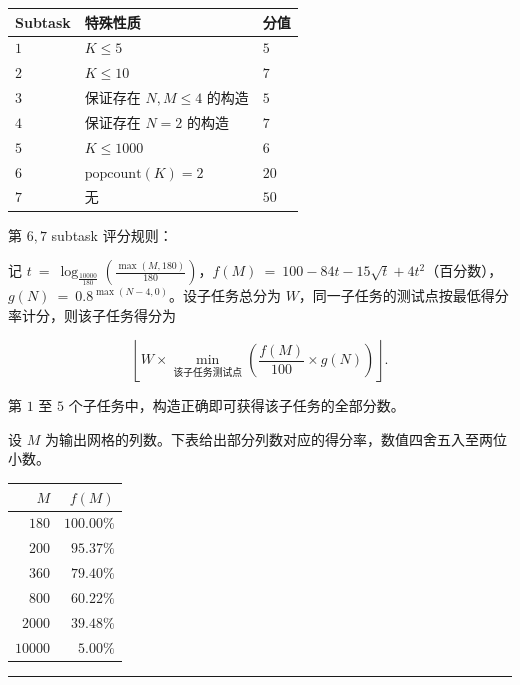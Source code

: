 \documentclass[12pt,a4paper,oneside]{ctexart}
\begin{document}
{\def\LTcaptype{none} %
\begin{longtable}[]{l|l|l}
\toprule\noalign{}
Subtask & 特殊性质 & 分值 \\
\midrule\noalign{}
\endhead
\bottomrule\noalign{}
\endlastfoot
\(1\) & \(K\le5\) & \(5\) \\ \hline
\(2\) & \(K\le10\) & \(7\) \\ \hline
\(3\) & 保证存在 \(N,M\le4\) 的构造 & \(5\) \\ \hline
\(4\) & 保证存在 \(N=2\) 的构造 & \(7\) \\ \hline
\(5\) & \(K\le1000\) & \(6\) \\ \hline
\(6\) & \(\text{popcount}(K)=2\) & \(20\) \\ \hline
\(7\) & 无 & \(50\) \\
\end{longtable}
}

第 \(6,7\) subtask 评分规则：

记 \(t\ =\ \log_{\frac{10000}{180}}\left(\frac{\max\left(M,180\right)}{180}\right)\)，\(f(M)\ =\ 100-84t-15\sqrt{t}+4t^{2}\)（百分数），\(g(N)\ =\ 0.8^{\max\left(N-4,0\right)}\)。设子任务总分为 \(W\)，同一子任务的测试点按最低得分率计分，则该子任务得分为

\[\left\lfloor W\times \min_{\text{该子任务测试点}}\left(\frac{f(M)}{100}\times g(N)\right)\right\rfloor.\]

第 \(1\) 至 \(5\) 个子任务中，构造正确即可获得该子任务的全部分数。

设 \(M\) 为输出网格的列数。下表给出部分列数对应的得分率，数值四舍五入至两位小数。

{\def\LTcaptype{none} %
\begin{longtable}[]{r|r}
\toprule\noalign{}
\(M\) & \(f(M)\) \\
\midrule\noalign{}
\endhead
\bottomrule\noalign{}
\endlastfoot
\(180\) & \(100.00\%\) \\ \hline
\(200\) & \(95.37\%\) \\ \hline
\(360\) & \(79.40\%\) \\ \hline
\(800\) & \(60.22\%\) \\ \hline
\(2000\) & \(39.48\%\) \\ \hline
\(10000\) & \(5.00\%\) \\
\end{longtable}
}

\begin{center}\rule{0.5\linewidth}{0.5pt}\end{center}
\end{document}
